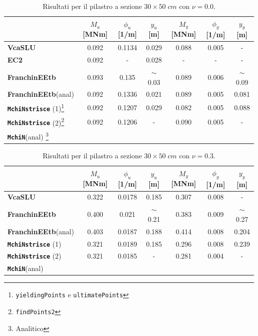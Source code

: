 \documentclass[10pt]{article}
\begin{document}
\begin{savenotes}

\begin{table}[H]
\centering
\begin{tabular}{l|ccc|ccc}
 & $M_u$ [MNm] & $\phi_u$ [1/m] & $y_u$ [m] & $M_y$ [MNm] & $\phi_y$ [1/m] & $y_y$ [m] \\
\hline
\textbf{VcaSLU}                & 0.092 & 0.1134 & 0.029 & 0.088 & 0.005 & - \\
\textbf{EC2}                   & 0.092 & -      & 0.028 & -     & -     & - \\
\textbf{FranchinEEtb}		   & 0.093 & 0.135  & $\sim$0.03 & 0.089 & 0.006 & $\sim$0.09 \\
\textbf{FranchinEEtb}(anal)	   & 0.092 & 0.1336 & 0.021 & 0.089 & 0.005 & 0.081 \\
\textbf{\texttt{MchiNstrisce}} (1)\footnote{\texttt{yieldingPoints} e \texttt{ultimatePoints}} 
                               & 0.092 & 0.1207 & 0.029 & 0.082 & 0.005 & 0.088 \\
\textbf{\texttt{MchiNstrisce}} (2)\footnote{\texttt{findPoints2}} 
							   & 0.092 & 0.1206 & -     & 0.090 & 0.005 & - \\
\textbf{\texttt{MchiN}}(anal)  \footnote{Analitico} 
                               & \\
\end{tabular}
\caption{\footnotesize Risultati per il pilastro a sezione $30\times50 \; cm$ con $\nu = 0.0$.}
\end{table}

\end{savenotes}

\begin{table}[H]
\centering
\begin{tabular}{l|ccc|ccc}
 & $M_u$ [MNm] & $\phi_u$ [1/m] & $y_u$ [m] & $M_y$ [MNm] & $\phi_y$ [1/m] & $y_y$ [m] \\
\hline
\textbf{VcaSLU}                    & 0.322 & 0.0178 & 0.185 & 0.307 & 0.008 & - \\
\textbf{FranchinEEtb}              & 0.400 & 0.021  & $\sim$0.21 & 0.383 & 0.009 & $\sim$0.27 \\
\textbf{FranchinEEtb}(anal)        & 0.403 & 0.0187 & 0.188 & 0.414 & 0.008 & 0.204 \\
\textbf{\texttt{MchiNstrisce}} (1) & 0.321 & 0.0189 & 0.185 & 0.296 & 0.008 & 0.239 \\
\textbf{\texttt{MchiNstrisce}} (2) & 0.321 & 0.0185 & -     & 0.281 & 0.004 & - \\
\textbf{\texttt{MchiN}}(anal)      & \\
\end{tabular}
\caption{\footnotesize Risultati per il pilastro a sezione $30\times50 \; cm$ con $\nu = 0.3$.}
\end{table}
\end{document}
